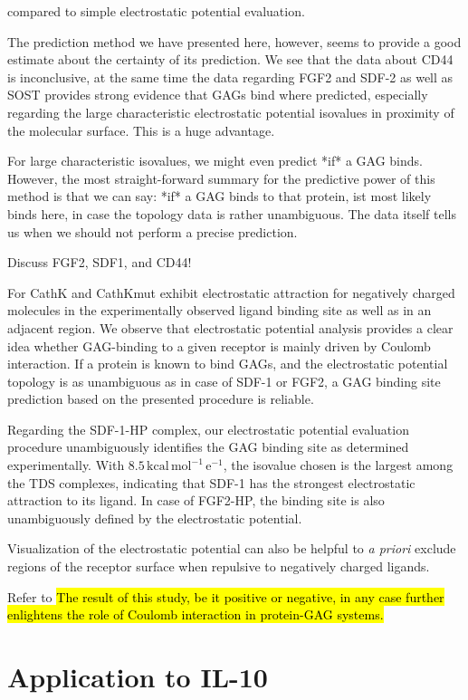 compared to simple electrostatic potential evaluation.

The prediction method we have presented here, however, seems to provide a good
estimate about the certainty of its prediction. We see that the data about CD44
is inconclusive, at the same time the data regarding FGF2 and SDF-2 as well as
SOST provides strong evidence that GAGs bind where predicted, especially regarding
the large characteristic electrostatic potential isovalues in proximity of the
molecular surface. This is a huge advantage.

For large characteristic isovalues, we might even predict *if* a GAG binds.
However, the most straight-forward summary for the predictive power of this
method is that we can say: *if* a GAG binds to that protein, ist most likely
binds here, in case the topology data is rather unambiguous. The data itself
tells us when we should not perform a precise prediction.


Discuss FGF2, SDF1, and CD44!

For
CathK and CathKmut exhibit
electrostatic attraction for negatively charged molecules in the experimentally
observed ligand binding site as well as in an adjacent region. We observe that
electrostatic potential analysis provides a clear idea whether GAG-binding to a
given receptor is mainly driven by Coulomb interaction. If a protein is known to
bind GAGs, and the electrostatic potential topology is as unambiguous as in case
of SDF-1 or FGF2, a GAG binding site prediction based on the presented procedure
is reliable.

Regarding the SDF-1-HP complex, our electrostatic potential evaluation procedure
unambiguously identifies the GAG binding site as determined experimentally. With
$8.5\,\mathrm{kcal\,mol^{-1}\,e^{-1}}$, the isovalue chosen is the largest among
the TDS complexes, indicating that SDF-1 has the strongest electrostatic
attraction to its ligand. In case of FGF2-HP, the binding site is also
unambiguously defined by the electrostatic potential.

Visualization of the electrostatic potential can also be helpful to
\textit{a priori} exclude regions of the receptor surface when repulsive to
negatively charged ligands.

Refer to \hl{The result of this study, be it positive or negative, in any case
further enlightens the role of Coulomb interaction in protein-GAG systems.}


\section{Application to IL-10}

